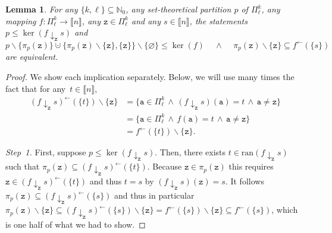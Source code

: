 \documentclass[10pt,a4paper]{amsart}
\numberwithin{equation}{section}
\newtheorem{Lemma}[Theorem]{Lemma}
\newcommand{\Sand}{\,\wedge\,}
\newcommand{\funcdef}{\colon}
\newcommand{\nnint}{{\mathbb{N}_0}}
\newcommand{\dwi}[1]{\llbracket{#1}\rrbracket}
\newcommand{\sranx}[1]{\mathrm{ran}(#1)}
\newcommand{\subproof}[1]{\textit{#1}}
\newcommand{\tsopx}[2]{\Pi^{#1}_{#2}}
\newcommand{\spimgx}[2]{#1^{\leftarrow}(#2)}
\newcommand{\finerthan}{\mathrel{\leq}}
\newcommand{\Yp}[1]{\mathtt{#1}}
\newcommand{\Yb}[1]{\mathsf{#1}}
\newcommand{\blo}[2]{\pi_{#1}(#2)}
\newcommand{\thedim}{n}
\begin{document}
{
  \newcommand{\inlen}{k}
  \newcommand{\outlen}{\ell}
  \newcommand{\theind}{f}
  \newcommand{\thepoint}{\Yp{z}}
  \newcommand{\thevalue}{s}
  \newcommand{\thepartition}{p}
  \newcommand{\thealtered}{\theind\downarrow_\thepoint\thevalue}
  \newcommand{\anypoint}{\Yp{a}}
  \newcommand{\theblock}{\blo{\thepartition}{\thepoint}}
  \newcommand{\cutblock}{\blo{\thepartition}{\thepoint}\backslash \{\thepoint\}}
  \newcommand{\sing}{\{\thepoint\}}
  \begin{Lemma}
    \label{lemma:easy-cohomology-helper-one-point-replacer}
    For any $\{\inlen,\outlen\}\!\subseteq\! \nnint$, any set-theo\-re\-ti\-cal partition $\thepartition$ of $\tsopx{\inlen}{\outlen}$, any mapping ${\theind\funcdef\!\tsopx{\inlen}{\outlen}\!\to\! \dwi{\thedim}}$, any $\thepoint\in\tsopx{\inlen}{\outlen}$ and any $\thevalue\in\dwi{\thedim}$,
    the statements $ \thepartition\finerthan\ker(\thealtered)$ and
    \[
\thepartition\backslash \{\theblock\}\cupdot \{\cutblock,\sing\}\backslash \{\varnothing\}\finerthan \ker(\theind)\quad\Sand\quad \cutblock\subseteq \spimgx{\theind}{\{\thevalue\}}
\]
are equivalent.
  \end{Lemma}
  \begin{proof}
    \newcommand{\somevalue}{t}
    \newcommand{\othervalue}{t'}
    \newcommand{\someblock}{\Yb{B}}
    We show each implication separately. Below, we will use many times the fact that for any~${\somevalue \in \dwi{\thedim}}$,
    \begin{align*}
      \spimgx{(\thealtered)}{\{\somevalue\}}\backslash \{\thepoint\}&{}=\{\anypoint\in\tsopx{\inlen}{\outlen}\Sand (\thealtered)(\anypoint)=\somevalue\Sand \anypoint\neq\thepoint \}\\
      &{}=\{\anypoint\in\tsopx{\inlen}{\outlen}\Sand \theind(\anypoint)=\somevalue\Sand \anypoint\neq\thepoint \}\\
    &{}=\spimgx{\theind}{\{\somevalue\}}\backslash \{\thepoint\}.
    \end{align*}

    \subproof{Step~1.}
    First, suppose $\thepartition\finerthan\ker(\thealtered)$. Then, there exists $\somevalue\in\sranx{\thealtered}$ such that $\theblock\subseteq \spimgx{(\thealtered)}{\{\somevalue\}}$. Because $\thepoint\in\theblock$ this requires $\thepoint\in \spimgx{(\thealtered)}{\{\somevalue\}}$ and thus $\somevalue=\thevalue$ by ${(\thealtered)(\thepoint)=\thevalue}$. It follows $\theblock\subseteq \spimgx{(\thealtered)}{\{\thevalue\}}$ and thus in particular $\cutblock\subseteq \spimgx{(\thealtered)}{\{\thevalue\}}\backslash \sing=\spimgx{\theind}{\{\thevalue\}}\backslash \{\thepoint\}\subseteq \spimgx{\theind}{\{\thevalue\}}$, which is one half of what we had to show.


\end{proof}}
\end{document}
